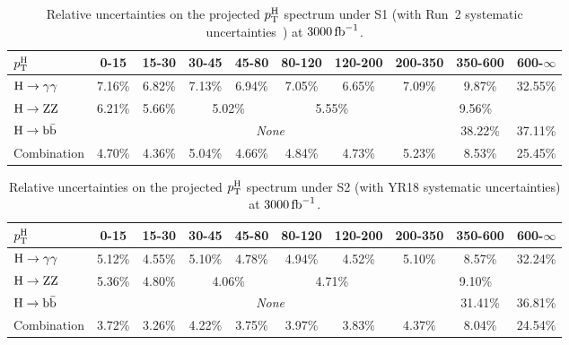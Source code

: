 \begin{table}[htb]
\footnotesize
\begin{center}
\begin{tabular}{|l|c|c|c|c|c|c|c|c|c|}
\hline
$p_\mathrm{T}^\mathrm{H}$       & 0-15    &  15-30   &  30-45    &  45-80   &  80-120  &  120-200  &  200-350  &  350-600  &  600-$\infty$  \\
\hline
$\mathrm{H}\to\mathrm{\gamma}\mathrm{\gamma}$       & 7.16\%  &  6.82\%  &  7.13\%   &  6.94\%  &  7.05\%  &  6.65\%   &  7.09\%   &  9.87\%   &  32.55\%  \\
\hline
$\mathrm{H}\to\mathrm{Z}\mathrm{Z}$       & 6.21\%  &  5.66\%  &  \multicolumn{2}{c|}{5.02\%}  &  \multicolumn{2}{c|}{5.55\%}  &  \multicolumn{3}{c|}{9.56\%} \\
\hline
$\mathrm{H}\to\mathrm{b}\bar{\mathrm{b}}$       & \multicolumn{7}{c|}{\textit{None}}                                                       &  38.22\%  &  37.11\%  \\
\hline
Combination  & 4.70\%  &  4.36\%  &  5.04\%   &  4.66\%  &  4.84\%  &  4.73\%   &  5.23\%   &  8.53\%   &  25.45\%  \\
\hline
\end{tabular}
\end{center}
\caption{
    Relative uncertainties on the projected $p_\mathrm{T}^\mathrm{H}$ spectrum under S1 (with Run~2 systematic uncertainties~\cite{CMS-PAS-HIG-17-028}) at $3000\,\text{fb}^{-1}$.
    }
\label{tab:proj_pth_unc_scen1}
\end{table}

\begin{table}[htb]
\footnotesize
\begin{center}
\begin{tabular}{|l|c|c|c|c|c|c|c|c|c|}
\hline
$p_\mathrm{T}^\mathrm{H}$       & 0-15    &  15-30   &  30-45    &  45-80   &  80-120  &  120-200  &  200-350  &  350-600  &  600-$\infty$  \\
\hline
$\mathrm{H}\to\mathrm{\gamma}\mathrm{\gamma}$       &  5.12\%  &   4.55\%  &  5.10\%   &   4.78\%   &   4.94\%   &   4.52\%   &  5.10\%   &  8.57\%   &   32.24\%    \\
\hline
$\mathrm{H}\to\mathrm{Z}\mathrm{Z}$       &  5.36\%  &   4.80\%  &  \multicolumn{2}{c|}{4.06\%}   &   \multicolumn{2}{c|}{4.71\%}   &   \multicolumn{3}{c|}{9.10\%}  \\
\hline
$\mathrm{H}\to\mathrm{b}\bar{\mathrm{b}}$       &  \multicolumn{7}{c|}{\textit{None}}                                                             &  31.41\%  &   36.81\%    \\
\hline
Combination  &  3.72\%  &   3.26\%  &  4.22\%   &   3.75\%   &   3.97\%   &   3.83\%   &  4.37\%   &  8.04\%   &   24.54\%    \\
\hline
\end{tabular}
\end{center}
\caption{
    Relative uncertainties on the projected $p_\mathrm{T}^\mathrm{H}$ spectrum under S2 (with YR18 systematic uncertainties) at $3000\,\text{fb}^{-1}$.
    }
\label{tab:proj_pth_unc_scen2}
\end{table}

